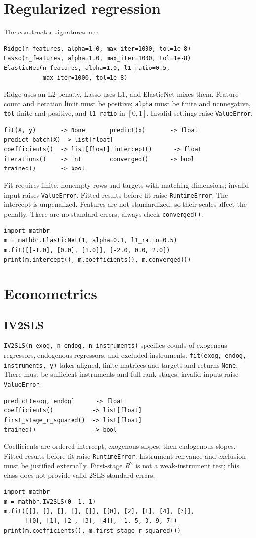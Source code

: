 \documentclass[11pt,a4paper]{article}
\begin{document}
\section{Regularized regression}
The constructor signatures are:
\begin{verbatim}
Ridge(n_features, alpha=1.0, max_iter=1000, tol=1e-8)
Lasso(n_features, alpha=1.0, max_iter=1000, tol=1e-8)
ElasticNet(n_features, alpha=1.0, l1_ratio=0.5,
           max_iter=1000, tol=1e-8)
\end{verbatim}
Ridge uses an L2 penalty, Lasso uses L1, and ElasticNet mixes them. Feature count and iteration limit must be positive; \verb|alpha| must be finite and nonnegative, \verb|tol| finite and positive, and \verb|l1_ratio| in $[0,1]$. Invalid settings raise \verb|ValueError|.
\begin{verbatim}
fit(X, y)       -> None       predict(x)       -> float
predict_batch(X) -> list[float]
coefficients()  -> list[float] intercept()      -> float
iterations()    -> int        converged()      -> bool
trained()       -> bool
\end{verbatim}
Fit requires finite, nonempty rows and targets with matching dimensions; invalid input raises \verb|ValueError|. Fitted results before fit raise \verb|RuntimeError|. The intercept is unpenalized. Features are not standardized, so their scales affect the penalty. There are no standard errors; always check \verb|converged()|.
\begin{verbatim}
import mathbr
m = mathbr.ElasticNet(1, alpha=0.1, l1_ratio=0.5)
m.fit([[-1.0], [0.0], [1.0]], [-2.0, 0.0, 2.0])
print(m.intercept(), m.coefficients(), m.converged())
\end{verbatim}

\section{Econometrics}
\subsection{IV2SLS}
\verb|IV2SLS(n_exog, n_endog, n_instruments)| specifies counts of exogenous regressors, endogenous regressors, and excluded instruments. \verb|fit(exog, endog, instruments, y)| takes aligned, finite matrices and targets and returns \verb|None|. There must be sufficient instruments and full-rank stages; invalid inputs raise \verb|ValueError|.
\begin{verbatim}
predict(exog, endog)      -> float
coefficients()           -> list[float]
first_stage_r_squared()  -> list[float]
trained()                -> bool
\end{verbatim}
Coefficients are ordered intercept, exogenous slopes, then endogenous slopes. Fitted results before fit raise \verb|RuntimeError|. Instrument relevance and exclusion must be justified externally. First-stage $R^2$ is not a weak-instrument test; this class does not provide valid 2SLS standard errors.
\begin{verbatim}
import mathbr
m = mathbr.IV2SLS(0, 1, 1)
m.fit([[], [], [], [], []], [[0], [2], [1], [4], [3]],
      [[0], [1], [2], [3], [4]], [1, 5, 3, 9, 7])
print(m.coefficients(), m.first_stage_r_squared())
\end{verbatim}
\end{document}
